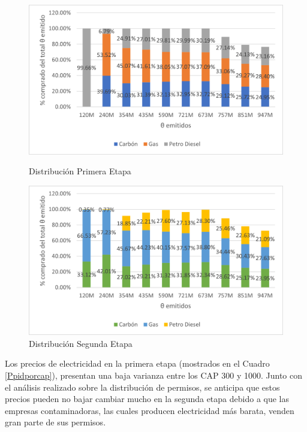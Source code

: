 \begin{figure}[H]
  \centering
  \begin{minipage}[b]{0.49\textwidth}
    \includegraphics[width=\textwidth]{docs/DocumentoMemoria/core/images/distr primera etapa precision.png}
    \caption{{\footnotesize Distribución Primera Etapa}}
    \label{distriMP1}
  \end{minipage}
  \hfill
  \begin{minipage}[b]{0.49\textwidth}
    \includegraphics[width=\textwidth]{docs/DocumentoMemoria/core/images/distr segunda etapa precision.png}
    \caption{{\footnotesize Distribución Segunda Etapa}}
     \label{distriMP3}
  \end{minipage}
\end{figure}

Los precios de electricidad en la primera etapa (mostrados en el Cuadro \ref{Ppidporcap}), presentan una baja varianza entre los CAP 300 y 1000. Junto con el análisis realizado sobre la distribución de permisos, se anticipa que estos precios pueden no bajar cambiar mucho en la segunda etapa debido a que las empresas contaminadoras, las cuales producen electricidad más barata, venden gran parte de sus permisos.
\vspace{2.5mm}


